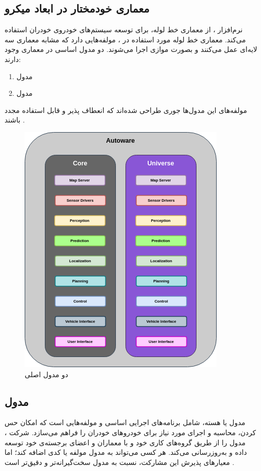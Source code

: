 \subsection{معماری خودمختار در ابعاد میکرو}
نرم‌افزار ، از معماری خط‌ لوله، برای توسعه سیستم‌های خودروی خودران استفاده می‌کند. معماری خط لوله مورد استفاده در ، مولفه‌هایی دارد که مشابه معماری سه لایه‌ای\cite{gat1998three} عمل می‌کنند و بصورت موازی اجرا می‌شوند. دو مدول اساسی در معماری  وجود دارند:
\begin{enumerate}
    \item مدول 
    \item مدول 
\end{enumerate}
مولفه‌های این مدول‌ها جوری طراحی شده‌اند که انعطاف پذیر و قابل استفاده مجدد باشند \cite{Autoware:Documentation}.

\begin{figure}[h!]
    \centering
    \includegraphics[width=0.5\linewidth]{figures/microautonomy_core_universe_modules.png}
    \caption{دو مدول اصلی  \cite{Autoware:Documentation}}
    \label{fig:Microautonomy_Core_Universe_Modules}
\end{figure}

\subsection{مدول }
مدول  یا هسته، شامل برنامه‌های اجرایی‌ اساسی و مولفه‌هایی است که امکان حس کردن، محاسبه و اجرای مورد نیاز برای خودروهای خودران را فراهم می‌سازد. شرکت ، مدول  را از طریق گروه‌های کاری خود و با معماران و اعضای برجسته‌ی خود توسعه داده و به‌روزرسانی می‌کند. هر کسی می‌تواند به مدول  مولفه یا کدی اضافه کند؛ اما معیارهای پذیرش این مشارکت، نسبت به مدول  سخت‌گیرانه‌تر و دقیق‌تر است \cite{Autoware:Documentation}.

